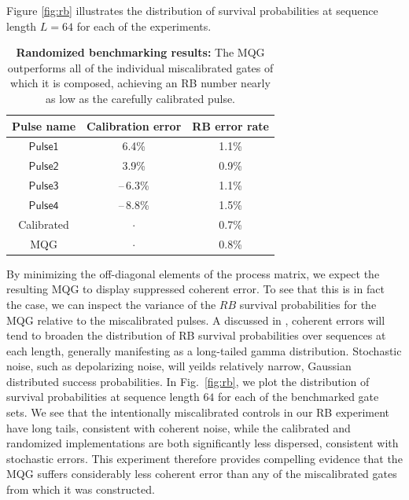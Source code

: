 \documentclass[aps,nofootinbib,pra,notitlepage,twocolumn]{revtex4-1}
\newcommand{\0}{\ensuremath{\mathbf{0}}}
\begin{document}
Figure \ref{fig:rb} illustrates the distribution of survival probabilities at sequence length $L=64$ for each of the experiments. 

\setlength{\tabcolsep}{0.5em} 
{\renewcommand{\arraystretch}{1.2}
\begin{table}[h]
	\label{tabl:rb}
	\centering
	\begin{tabular}{@{}ccc@{}}
		\hline
		Pulse name & Calibration error & RB error rate\\
		\hline
		$\mathsf{Pulse1}$ 	& 6.4\% 	& 1.1\% \\
		$\mathsf{Pulse2}$ 	& 3.9\% 	& 0.9\% \\
		$\mathsf{Pulse3}$ 	& --\,6.3\% 	& 1.1\% \\
		$\mathsf{Pulse4}$ 	& --\,8.8\% 	& 1.5\% \\
		Calibrated 			& $\cdot$  	& 0.7\% \\
		MQG 				& $\cdot$ 	& 0.8\% \\
		\hline
	\end{tabular}
	\caption{\textbf{Randomized benchmarking results:} The MQG outperforms all of the individual miscalibrated gates of which it is composed, achieving an RB number nearly as low as the carefully calibrated pulse. }
\end{table}

By minimizing the off-diagonal elements of the process matrix, we expect the resulting MQG to display suppressed coherent error. To see that this is in fact the case, we can inspect the variance of the $RB$ survival probabilities for the MQG relative to the miscalibrated pulses. A discussed in \cite{Ball2016}, coherent errors will tend to broaden the distribution of RB survival probabilities over sequences at each length, generally manifesting as a long-tailed gamma distribution. Stochastic noise, such as depolarizing noise, will yeilds relatively narrow, Gaussian distributed success probabilities. In Fig.~\ref{fig:rb}, we plot the distribution of survival probabilities at sequence length $64$ for each of the benchmarked gate sets. We see that the intentionally miscalibrated controls in our RB experiment have long tails, consistent with coherent noise, while the calibrated and randomized implementations are both significantly less dispersed, consistent with stochastic errors. This experiment therefore provides compelling evidence that the MQG suffers considerably less coherent error than any of the miscalibrated gates from which it was constructed.


}
\end{document}
